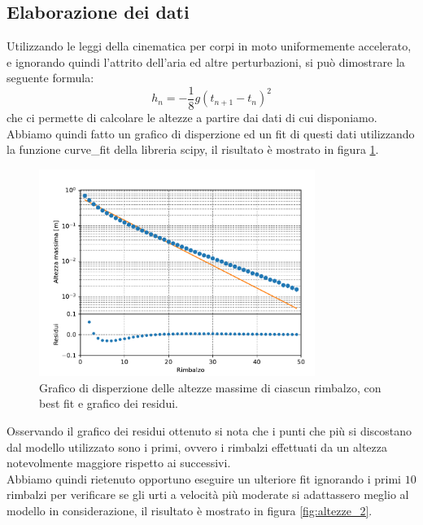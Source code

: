 \documentclass[a4paper]{article}
\begin{document}
    \subsection{Elaborazione dei dati}
    Utilizzando le leggi della cinematica per corpi in moto uniformemente accelerato,
    e ignorando quindi l'attrito dell'aria ed altre perturbazioni, si può dimostrare la
    seguente formula:
    \begin{equation}
        \label{eq:altezza_2}
        h_n=-\frac{1}{8}g\left( t_{n+1}-t_{n} \right) ^2
    \end{equation}
    che ci permette di calcolare le altezze a partire dai dati di cui disponiamo.\\
    Abbiamo quindi fatto un grafico di disperzione ed un fit di questi dati utilizzando
    la funzione curve\_fit della libreria scipy, il risultato è mostrato in figura \ref{fig:altezze}.
    \begin{figure}[ht!]
        \centering
        \includegraphics[width=0.8\textwidth]{extra/altezza_rimbalzi.pdf}
        \caption{Grafico di disperzione delle altezze massime di ciascun rimbalzo,
        con best fit e grafico dei residui.}
        \label{fig:altezze}
    \end{figure}
    Osservando il grafico dei residui ottenuto si nota che i punti che più si discostano
    dal modello utilizzato sono i primi, ovvero i rimbalzi effettuati da un altezza 
    notevolmente maggiore rispetto ai successivi.\\
    Abbiamo quindi rietenuto opportuno eseguire un ulteriore fit ignorando i primi $10$ rimbalzi
    per verificare se gli urti a velocità più moderate si adattassero meglio al modello
    in considerazione, il risultato è mostrato in figura \ref{fig:altezze_2}.\\
\end{document}
